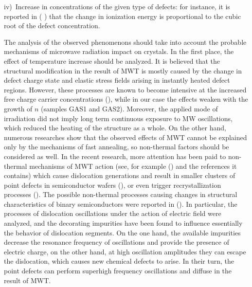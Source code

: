 \documentclass[final,3p,times,twocolumn,authoryear]{elsarticle}
\begin{document}
\noindent
iv)~Increase in concentrations of the given type of defects:
for instance, it is reported in (\cite{Stellmacher} ) that the change in ionization energy is proportional to the cubic root of the defect concentration.

The analysis of the observed phenomenons should take into account
the probable mechanisms of microwave radiation impact on crystals.
In the first place, the effect of temperature increase should be analyzed.
It is believed that the structural modification in the result of MWT  is mostly caused by the change
in defect charge state and elastic stress fields arising in instantly heated defect regions.
However, these processes are known to become intensive at the increased free charge carrier concentrations (\cite{MW:Rev}),
while in our case the effects weaken with the growth of $n$ (samples GAS1 and GAS2).
Moreover, the applied mode of irradiation did not imply long term continuous exposure to MW oscillations,
which reduced the heating of the structure as a whole.
On the other hand, numerous researches show that the observed effects of MWT cannot be explained only by the mechanisms of fast  annealing,
so non-thermal factors should be considered as well.
In the recent research, more attention has been paid to non-thermal mechanisms of MWT action
(see, for example (\cite{MW:Si2018}) and the references it contains)
which cause dislocation generations and result in smaller  clusters of point defects in semiconductor wafers (\cite{Konakova2007JTFEn}),
or even trigger recrystallization processes (\cite{MW:Si2018}).
The possible non-thermal processes causing changes in structural characteristics of binary semiconductors were reported in (\cite{Konakova2007JTFEn}).
In particular, the processes of dislocation oscillations under the action of electric field were analyzed,
and the decorating impurities have been found to influence essentially the behavior of dislocation segments.
On the one hand, the available impurities decrease the resonance frequency of oscillations
and provide the presence of electric charge,
on the other hand, at high oscillation amplitudes they can escape the dislocation,
which causes new chemical defects to arise.
In their turn, the point defects can perform superhigh frequency oscillations and diffuse in the result of MWT.
\end{document}
